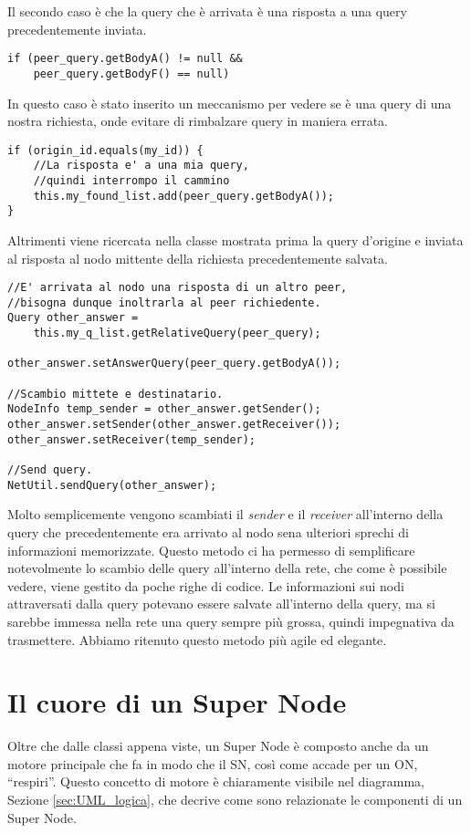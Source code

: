 Il secondo caso è che la query che è arrivata è una risposta a una query precedentemente inviata.
\begin{lstlisting}
if (peer_query.getBodyA() != null &&
	peer_query.getBodyF() == null)
\end{lstlisting}
In questo caso è stato inserito un meccanismo per vedere se è una query di una nostra richiesta, onde evitare di rimbalzare query in maniera errata.
\begin{lstlisting}
if (origin_id.equals(my_id)) {
	//La risposta e' a una mia query, 
	//quindi interrompo il cammino
	this.my_found_list.add(peer_query.getBodyA());
}
\end{lstlisting}
Altrimenti viene ricercata nella classe mostrata prima la query d'origine e inviata al risposta al nodo mittente della richiesta precedentemente salvata.
\begin{lstlisting}
//E' arrivata al nodo una risposta di un altro peer,
//bisogna dunque inoltrarla al peer richiedente.
Query other_answer = 
	this.my_q_list.getRelativeQuery(peer_query);

other_answer.setAnswerQuery(peer_query.getBodyA());

//Scambio mittete e destinatario.
NodeInfo temp_sender = other_answer.getSender();
other_answer.setSender(other_answer.getReceiver());
other_answer.setReceiver(temp_sender);

//Send query.
NetUtil.sendQuery(other_answer);
\end{lstlisting}
Molto semplicemente vengono scambiati il \emph{sender} e il \emph{receiver} all'interno della query che precedentemente era arrivato al nodo sena ulteriori sprechi di informazioni memorizzate.
Questo metodo ci ha permesso di semplificare notevolmente lo scambio delle query all'interno della rete, che come è possibile vedere, viene gestito da poche righe di codice.
Le informazioni sui nodi attraversati dalla query potevano essere salvate all'interno della query, ma si sarebbe immessa nella rete una query sempre più grossa, quindi impegnativa da trasmettere.
Abbiamo ritenuto questo metodo più agile ed elegante.


\section{Il cuore di un Super Node}
Oltre che dalle classi appena viste, un Super Node è composto anche da un motore principale che fa in modo che il SN, così come accade per un ON, ``respiri''.
Questo concetto di motore è chiaramente visibile nel diagramma, Sezione \ref{sec:UML_logica}, che decrive come sono relazionate le componenti di un Super Node.
